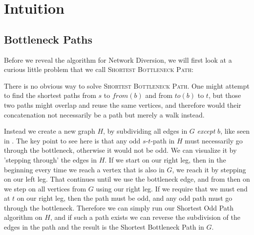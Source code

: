 \section{Intuition}
\subsection{Bottleneck Paths}
\label{section:subdividing-bottlenecks}
Before we reveal the algorithm for Network Diversion, we will first look at a curious little problem that we call \textsc{Shortest Bottleneck Path}:

\noindent{}

There is no obvious way to solve \textsc{Shortest Bottleneck Path}. One might attempt to find the shortest paths from $s$ to $from(b)$ and from $to(b)$ to $t$, but those two paths might overlap and reuse the same vertices, and therefore would their concatenation not necessarily be a path but merely a walk instead.

Instead we create a new graph $H$, by subdividing all edges in $G$ \emph{except} $b$, like seen in . The key point to see here is that any odd $s$-$t$-path in $H$ must necessarily go through the bottleneck, otherwise it would not be odd. We can visualize it by 'stepping through' the edges in $H$. If we start on our right leg, then in the beginning every time we reach a vertex that is also in $G$, we reach it by stepping on our left leg. That continues until we use the bottleneck edge, and from then on we step on all vertices from $G$ using our right leg. If we require that we must end at $t$ on our right leg, then the path must be odd, and any odd path must go through the bottleneck. Therefore we can simply run our Shortest Odd Path algorithm on $H$, and if such a path exists we can reverse the subdivision of the edges in the path and the result is the Shortest Bottleneck Path in $G$.

